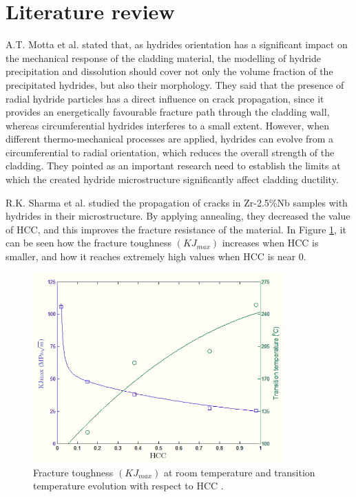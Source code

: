 \section{Literature review}

\noindent
A.T. Motta et al. \cite{MOTTA} stated that, as hydrides orientation has a significant impact on the mechanical response of the cladding material, the modelling of hydride precipitation and dissolution should cover not only the volume fraction of the precipitated hydrides, but also their morphology. They said that the presence of radial hydride particles has a direct influence on crack propagation, since it provides an energetically favourable fracture path through the cladding wall, whereas circumferential hydrides interferes to a small extent. However, when different thermo-mechanical processes are applied, hydrides can evolve from a circumferential to radial orientation, which reduces the overall strength of the cladding. They pointed as an important research need to establish the limits at which the created hydride microstructure significantly affect cladding ductility.

\noindent
R.K. Sharma et al. \cite{SHARMA2018546} studied the propagation of cracks in  Zr-2.5\%Nb samples with hydrides in their microstructure. By applying annealing, they decreased the value of HCC, and this improves the fracture resistance of the material. In Figure  \ref{fig:ref2}, it can be seen how the fracture toughness $(KJ_{max})$ increases when HCC is smaller, and how it reaches extremely high values when HCC is near 0.

\begin{figure}[h] %
    \centering
    \includegraphics[width=3.8in]{Figures/4-Lit. Review/HCCref2.png}
    \caption{Fracture toughness $(KJ_{max})$ at room temperature and transition temperature evolution with respect to HCC \cite{SHARMA2018546}.}
    \label{fig:ref2}
\end{figure}

